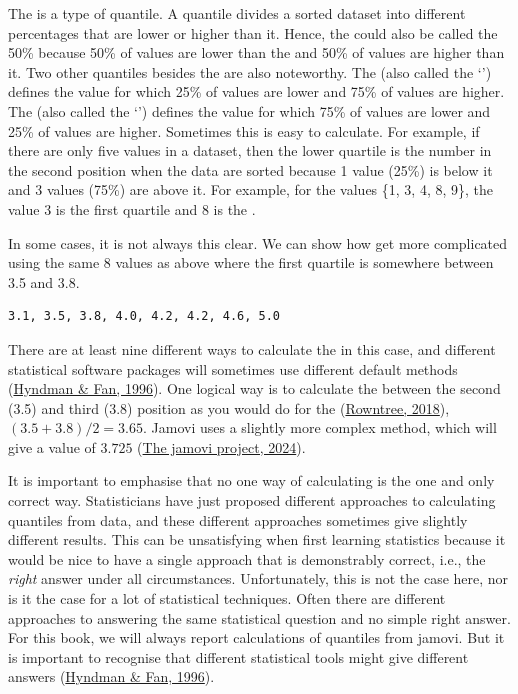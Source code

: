 \documentclass[
  openany]{krantz}
\begin{document}
The  is a type of quantile.
A quantile divides a sorted dataset into different percentages that are lower or higher than it.
Hence, the  could also be called the 50\%  because 50\% of values are lower than the  and 50\% of values are higher than it.
Two other quantiles besides the  are also noteworthy.
The   (also called the `') defines the value for which 25\% of values are lower and 75\% of values are higher.
The  (also called the `') defines the value for which 75\% of values are lower and 25\% of values are higher.
Sometimes this is easy to calculate.
For example, if there are only five values in a dataset, then the lower quartile is the number in the second position when the data are sorted because 1 value (25\%) is below it and 3 values (75\%) are above it.
For example, for the values \{1, 3, 4, 8, 9\}, the value 3 is the first quartile and 8 is the .

In some cases, it is not always this clear.
We can show how  get more complicated using the same 8 values as above where the first quartile is somewhere between 3.5 and 3.8.

\begin{verbatim}
3.1, 3.5, 3.8, 4.0, 4.2, 4.2, 4.6, 5.0
\end{verbatim}

There are at least nine different ways to calculate the  in this case, and different statistical software packages will sometimes use different default methods (\protect\hyperlink{ref-Hyndman1996}{Hyndman \& Fan, 1996}).
One logical way is to calculate the  between the second (3.5) and third (3.8) position as you would do for the  (\protect\hyperlink{ref-Rowntree2018}{Rowntree, 2018}), \((3.5 + 3.8) / 2 = 3.65\).
Jamovi uses a slightly more complex method, which will give a value of \(3.725\) (\protect\hyperlink{ref-Jamovi2022}{The jamovi project, 2024}).

It is important to emphasise that no one way of calculating  is the one and only correct way.
Statisticians have just proposed different approaches to calculating quantiles from data, and these different approaches sometimes give slightly different results.
This can be unsatisfying when first learning statistics because it would be nice to have a single approach that is demonstrably correct, i.e., the \emph{right} answer under all circumstances.
Unfortunately, this is not the case here, nor is it the case for a lot of statistical techniques.
Often there are different approaches to answering the same statistical question and no simple right answer.
For this book, we will always report calculations of quantiles from jamovi.
But it is important to recognise that different statistical tools might give different answers (\protect\hyperlink{ref-Hyndman1996}{Hyndman \& Fan, 1996}).
\end{document}
